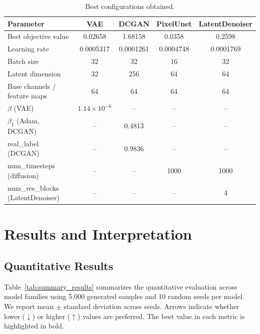 \documentclass[runningheads]{llncs}
\begin{document}
\begin{table}[H]
    \centering
    \caption{Best configurations obtained.}
    \label{tab:hpo_best}
    \begin{tabular}{p{}cccc}
        \toprule
        \textbf{Parameter} & \textbf{VAE} & \textbf{DCGAN} & \textbf{PixelUnet} & \textbf{LatentDenoiser}\\
        \midrule
        Best objective value & 0.02658 & 1.68158 & 0.0358 & 0.2598 \\
        Learning rate & 0.0005317 & 0.0001261 & 0.0004748 & 0.0001769\\
        Batch size & 32 & 32 & 16 & 32 \\
        Latent dimension & 32 & 256 & 64 & 64 \\
        Base channels / feature maps & 64 & 64 & 64 & 64 \\
        $\beta$ (VAE) & $1.14 \times 10^{-6}$ & -- & -- & -- \\
        $\beta_1$ (Adam, DCGAN) & -- & 0.4813 & -- & -- \\
        real\_label (DCGAN) & -- & 0.9836 & -- & -- \\
        num\_timesteps (diffusion) & -- & -- & 1000 & 1000 \\
        num\_res\_blocks (LatentDenoiser) & -- & -- & -- & 4 \\
        \bottomrule
    \end{tabular}
\end{table}

\section{Results and Interpretation}

\subsection{Quantitative Results}
Table~\ref{tab:summary_results} summarizes the quantitative evaluation across model families using 5{,}000 generated 
samples and 10 random seeds per model. We report mean $\pm$ standard deviation across seeds. 
Arrows indicate whether lower ($\downarrow$) or higher ($\uparrow$) values are preferred. 
The best value in each metric is highlighted in bold.
\end{document}

